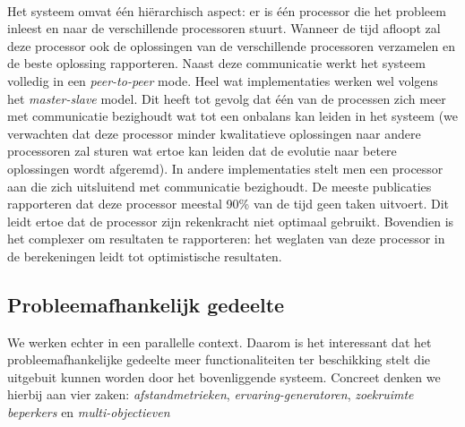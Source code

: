 \paragraph{}
Het systeem omvat \'e\'en hi\"erarchisch aspect: er is \'e\'en processor die het probleem inleest en naar de verschillende processoren stuurt. Wanneer de tijd afloopt zal deze processor ook de oplossingen van de verschillende processoren verzamelen en de beste oplossing rapporteren. Naast deze communicatie werkt het systeem volledig in een \emph{peer-to-peer} mode. Heel wat implementaties werken wel volgens het \emph{master-slave} model\cite{}. Dit heeft tot gevolg dat \'e\'en van de processen zich meer met communicatie bezighoudt wat tot een onbalans kan leiden in het systeem (we verwachten dat deze processor minder kwalitatieve oplossingen naar andere processoren zal sturen wat ertoe kan leiden dat de evolutie naar betere oplossingen wordt afgeremd). In andere implementaties\cite{} stelt men een processor aan die zich uitsluitend met communicatie bezighoudt. De meeste publicaties rapporteren dat deze processor meestal 90\% van de tijd geen taken uitvoert. Dit leidt ertoe dat de processor zijn rekenkracht niet optimaal gebruikt. Bovendien is het complexer om resultaten te rapporteren: het weglaten van deze processor in de berekeningen leidt tot optimistische resultaten.


\subsection{Probleemafhankelijk gedeelte}

We werken echter in een parallelle context. Daarom is het interessant dat het probleemafhankelijke gedeelte meer functionaliteiten ter beschikking stelt die uitgebuit kunnen worden door het bovenliggende systeem. Concreet denken we hierbij aan vier zaken: \emph{afstandmetrieken}, \emph{ervaring-generatoren}, \emph{zoekruimte beperkers} en \emph{multi-objectieven}

